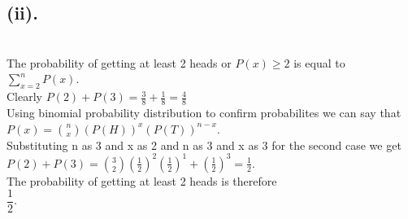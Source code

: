 \documentclass{article}
\begin{document}
\subsection*{(ii).}\\
The probability of getting at least 2 heads or $P(x)\geq 2$ is equal to $\sum_{x=2}^{n}P(x)$. \\[4pt]
Clearly $P(2)+P(3)= \frac{3}{8}+\frac{1}{8}= \frac{4}{8}$\\[4pt]
Using binomial probability distribution to confirm probabilites we can say that $P(x)={n\choose x}(P(H))^x(P(T))^{n-x}$.\\[4pt]
Substituting n as 3 and x as 2 and n as 3 and x as 3 for the second case we get $P(2)+P(3)={3\choose 2}(\frac{1}{2})^2(\frac{1}{2})^1+(\frac{1}{2})^3=\frac{1}{2}$.\\[4pt]
The probability of getting at least 2 heads is therefore\\ $\dfrac{1}{2}$.
\end{document}

